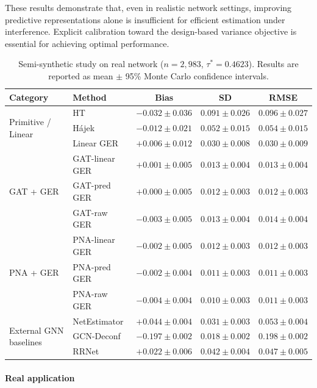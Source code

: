 \documentclass{article}
\theoremstyle{plain}
\theoremstyle{definition}
\theoremstyle{remark}
\begin{document}
These results demonstrate that, even in realistic network settings, improving predictive representations alone is insufficient for efficient estimation under interference. Explicit calibration toward the design-based variance objective is essential for achieving optimal performance.
\begin{table}[htbp]
\centering
\caption{Semi-synthetic study on real network ($n=2{,}983$, $\tau^* = 0.4623$). 
Results are reported as mean $\pm$ 95\% Monte Carlo confidence intervals.}
\small
\begin{tabular}{llccc}
\toprule
Category & Method & Bias & SD & RMSE \\
\midrule
\multirow{3}{*}{Primitive / Linear}
& HT 
& $-0.032 \pm 0.036$ 
& $0.091 \pm 0.026$ 
& $0.096 \pm 0.027$ \\
& H\'{a}jek 
& $-0.012 \pm 0.021$ 
& $0.052 \pm 0.015$ 
& $0.054 \pm 0.015$ \\
& Linear GER 
& $+0.006 \pm 0.012$ 
& $0.030 \pm 0.008$ 
& $0.030 \pm 0.009$ \\
\midrule
\multirow{3}{*}{GAT + GER}
& GAT-linear GER 
& $+0.001 \pm 0.005$ 
& $0.013 \pm 0.004$ 
& $0.013 \pm 0.004$ \\
& GAT-pred GER 
& $+0.000 \pm 0.005$ 
& $0.012 \pm 0.003$ 
& $0.012 \pm 0.003$ \\
& GAT-raw GER 
& $-0.003 \pm 0.005$ 
& $0.013 \pm 0.004$ 
& $0.014 \pm 0.004$ \\
\midrule
\multirow{3}{*}{PNA + GER}
& PNA-linear GER 
& $-0.002 \pm 0.005$ 
& $0.012 \pm 0.003$ 
& $0.012 \pm 0.003$ \\
& PNA-pred GER 
& $\mathbf{-0.002 \pm 0.004}$ 
& $\mathbf{0.011 \pm 0.003}$ 
& $\mathbf{0.011 \pm 0.003}$ \\
& PNA-raw GER 
& $-0.004 \pm 0.004$ 
& $\mathbf{0.010 \pm 0.003}$ 
& $\mathbf{0.011 \pm 0.003}$ \\
\midrule
\multirow{3}{*}{External GNN baselines}
& NetEstimator 
& $+0.044 \pm 0.004$ 
& $0.031 \pm 0.003$ 
& $0.053 \pm 0.004$ \\
& GCN-Deconf 
& $-0.197 \pm 0.002$ 
& $0.018 \pm 0.002$ 
& $0.198 \pm 0.002$ \\
& RRNet 
& $+0.022 \pm 0.006$ 
& $0.042 \pm 0.004$ 
& $0.047 \pm 0.005$ \\
\bottomrule
\end{tabular}
\label{tab:semi_synthetic_full}
\end{table}
\paragraph{Real application}
\end{document}

